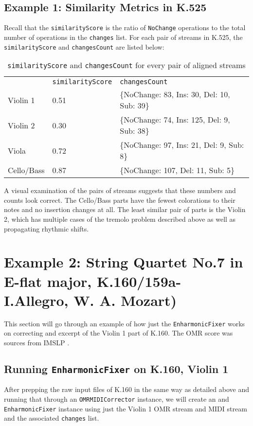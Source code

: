 \subsection{Example 1: Similarity Metrics in K.525}
Recall that the \texttt{similarityScore} is the ratio of \texttt{NoChange} operations to the total number of operations in the \texttt{changes} list. For each pair of streams in K.525, the \texttt{similarityScore} and \texttt{changesCount} are listed below:
\begin{table}[H]
\centering
\begin{tabular}{lll}
           & \texttt{similarityScore} & \texttt{changesCount}                                                  \\
Violin 1   & 0.51                       & \{NoChange: 83, Ins: 30, Del: 10, Sub: 39\} \\
Violin 2   & 0.30                       & \{NoChange: 74, Ins: 125, Del: 9, Sub: 38\} \\
Viola      & 0.72                       & \{NoChange: 97, Ins: 21, Del: 9, Sub: 8\}   \\
Cello/Bass & 0.87                       & \{NoChange: 107, Del: 11, Sub: 5\}               
\end{tabular}
\caption{\texttt{similarityScore} and \texttt{changesCount} for every pair of aligned streams}
\end{table}

A visual examination of the pairs of streams suggests that these numbers and counts look correct. The Cello/Bass parts have the fewest colorations to their notes and no insertion changes at all. The least similar pair of parts is the Violin 2, which has multiple cases of the tremolo problem described above as well as propagating rhythmic shifts.

\section{Example 2: String Quartet No.7 in E-flat major, K.160/159a- I.Allegro, W. A. Mozart)}
This section will go through an example of how just the \texttt{EnharmonicFixer} works on correcting and excerpt of the Violin 1 part of K.160. The OMR score was sources from IMSLP \cite{k160}.

\subsection{Running \texttt{EnharmonicFixer} on K.160, Violin 1}
After prepping the raw input files of K.160 in the same way as detailed above and running that through an \texttt{OMRMIDICorrector} instance, we will create an and \texttt{EnharmonicFixer} instance using just the Violin 1 OMR stream and MIDI stream and the associated \texttt{changes} list.

